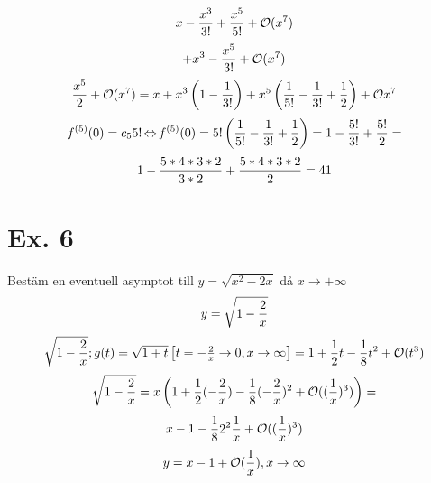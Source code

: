 \documentclass{article}
\newcommand{\Or}{{\mathcal{O}}}
\begin{document}
$$x - \f{x^3}{3!} + \f{x^5}{5!} + \Or(x^7) $$
$$ + x^3 - \f{x^5}{3!} + \Or(x^7) $$
$$ \f{x^5}{2} + \Or(x^7) = x+x^3\pa{1-\f 1{3!}} + x^5\pa{\f 1{5!} - \f 1{3!} + \f 12} + \Or{x^7} $$
$$ f^{(5)}(0) = c_5 5! \operatorname{\Leftrightarrow} f^{(5)}(0) = 5!\left(\frac{1}{5!} - \frac{1}{3!} + \frac{1}{2}\right) = 1- \frac{5!}{3!} + \frac{5!}{2} =$$
$$ 1 - \frac{5*4*3*2}{3*2}+\frac{5*4*3*2}{2} = 41 $$

\section{Ex. 6}
Bestäm en eventuell asymptot till $y=\sqrt{x^2-2x}$ då $x\to +\infty$
$$ y = \sqrt{1-\frac{2}{x} } $$
$$ \sqrt{1 - \f 2x}; g(t) = \sqrt{1+t} \bmat{t=-\f 2x \to 0, x \to \infty} = 1+\f 12 t - \f 18 t^2 + \Or(t^3) $$
$$ \sqrt{1-\f 2x} = x\pa{ 1 + \f 12(-\f 2x) - \f 18 (- \f 2x)^2  + \Or((\f 1x)^3)} = $$
$$ x- 1 - \f 18 2^2\f 1x + \Or((\f 1x)^3) $$
$$ y = x-1 + \Or(\f 1x), x\to \infty $$
\end{document}
